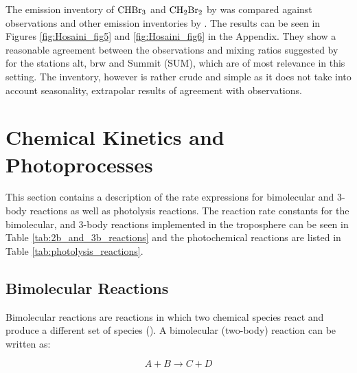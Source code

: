 The emission inventory of $\mathrm{CHBr_3}$ and $\mathrm{CH_2Br_2}$ by \cite{Liang2010} was compared against observations and other emission inventories by \cite{Hossaini2013}. The results can be seen in Figures \ref{fig:Hosaini_fig5} and \ref{fig:Hosaini_fig6} in the Appendix. They show a reasonable agreement between the observations and mixing ratios suggested by \cite{Liang2010} for the stations \acrfull{alt}, \acrfull{brw} and Summit (SUM), which are of most relevance in this setting. The inventory, however is rather crude and simple as it does not take into account seasonality, extrapolar results of agreement with observations. 





\section{Chemical Kinetics and Photoprocesses}\label{sec:chem_kinetics}

This section contains a description of the rate expressions for bimolecular and 3-body reactions as well as photolysis reactions. The reaction rate constants for the bimolecular, and 3-body reactions implemented in the troposphere can be seen in Table \ref{tab:2b_and_3b_reactions} and the photochemical reactions are listed in Table \ref{tab:photolysis_reactions}.






\subsection{Bimolecular Reactions}\label{sec:bimolecular_reactions}

Bimolecular reactions are reactions in which two chemical species react and produce a different set of species (\cite{Jacob1999}). A bimolecular (two-body) reaction can be written as: 

\begin{equation*}
    A + B \rightarrow C + D
\end{equation*}


